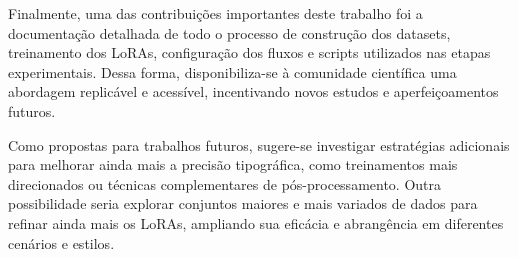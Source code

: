 \documentclass[12pt, %
openright, 
oneside, %
a4paper,    %
brazil]{facom-ufu-abntex2}
\begin{document}
Finalmente, uma das contribuições importantes deste trabalho foi a documentação detalhada de todo o processo de construção dos datasets, treinamento dos LoRAs, configuração dos fluxos e scripts utilizados nas etapas experimentais. Dessa forma, disponibiliza-se à comunidade científica uma abordagem replicável e acessível, incentivando novos estudos e aperfeiçoamentos futuros.

Como propostas para trabalhos futuros, sugere-se investigar estratégias adicionais para melhorar ainda mais a precisão tipográfica, como treinamentos mais direcionados ou técnicas complementares de pós-processamento. Outra possibilidade seria explorar conjuntos maiores e mais variados de dados para refinar ainda mais os LoRAs, ampliando sua eficácia e abrangência em diferentes cenários e estilos.



\postextual









\end{document}
